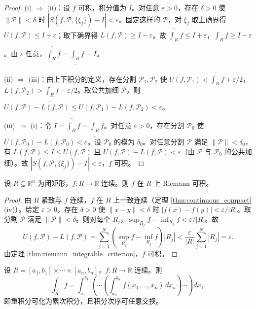 \begin{proof}
(i) $\Rightarrow$ (ii)：设 $f$ 可积，积分值为 $I$。对任意 $\varepsilon > 0$，存在 $\delta > 0$ 使 $\|\mathcal{P}\| < \delta$ 时 $|S(f, \mathcal{P}, \{\xi_j\}) - I| < \varepsilon$。固定这样的 $\mathcal{P}$，对 $\xi_j$ 取上确界得 $U(f, \mathcal{P}) \le I + \varepsilon$；取下确界得 $L(f, \mathcal{P}) \ge I - \varepsilon$。故 $\overline{\int_R} f \le I + \varepsilon$，$\underline{\int_R} f \ge I - \varepsilon$。由 $\varepsilon$ 任意，$\overline{\int_R} f = \underline{\int_R} f = I$。

(ii) $\Rightarrow$ (iii)：由上下积分的定义，存在分割 $\mathcal{P}_1, \mathcal{P}_2$ 使 $U(f, \mathcal{P}_1) < \overline{\int_R} f + \varepsilon/2$，$L(f, \mathcal{P}_2) > \underline{\int_R} f - \varepsilon/2$。取公共加细 $\mathcal{P}$，则 $U(f, \mathcal{P}) - L(f, \mathcal{P}) \le U(f, \mathcal{P}_1) - L(f, \mathcal{P}_2) < \varepsilon$。

(iii) $\Rightarrow$ (i)：令 $I = \overline{\int_R} f = \underline{\int_R} f$。对任意 $\varepsilon > 0$，存在分割 $\mathcal{P}_0$ 使 $U(f, \mathcal{P}_0) - L(f, \mathcal{P}_0) < \varepsilon$。设 $\mathcal{P}_0$ 的模为 $\delta_0$。对任意分割 $\mathcal{P}$ 满足 $\|\mathcal{P}\| < \delta_0$，有 $L(f, \mathcal{P}) \le I \le U(f, \mathcal{P})$ 且 $U(f, \mathcal{P}) - L(f, \mathcal{P}) < \varepsilon$（由 $\mathcal{P}$ 与 $\mathcal{P}_0$ 的公共加细）。故 $|S(f, \mathcal{P}, \{\xi_j\}) - I| < \varepsilon$，$f$ 可积。
\end{proof}

\begin{theorem}[连续函数可积]\label{thm:continuous_integrable}
设 $R \subseteq \mathbb{R}^n$ 为闭矩形，$f: R \to \mathbb{R}$ 连续。则 $f$ 在 $R$ 上 Riemann 可积。
\end{theorem}

\begin{proof}
由 $R$ 紧致与 $f$ 连续，$f$ 在 $R$ 上一致连续（定理 \ref{thm:continuous_compact} (iv)）。给定 $\varepsilon > 0$，存在 $\delta > 0$ 使 $\|x - y\| < \delta$ 时 $|f(x) - f(y)| < \varepsilon / |R|$。取分割 $\mathcal{P}$ 满足 $\|\mathcal{P}\| < \delta$。则对每个 $R_j$，$\sup_{R_j} f - \inf_{R_j} f < \varepsilon / |R|$。故
\[
U(f, \mathcal{P}) - L(f, \mathcal{P}) = \sum_{j=1}^{N} \left( \sup_{R_j} f - \inf_{R_j} f \right) |R_j| < \frac{\varepsilon}{|R|} \sum_{j=1}^{N} |R_j| = \varepsilon.
\]
由定理 \ref{thm:riemann_integrable_criterion}，$f$ 可积。
\end{proof}

\begin{theorem}[Fubini 定理]\label{thm:fubini_ra}
设 $R = [a_1, b_1] \times \cdots \times [a_n, b_n]$，$f: R \to \mathbb{R}$ 连续。则
\[
\int_R f = \int_{a_1}^{b_1} \left( \cdots \left( \int_{a_n}^{b_n} f(x_1, \dots, x_n) \, dx_n \right) \cdots \right) dx_1.
\]
即重积分可化为累次积分，且积分次序可任意交换。
\end{theorem}

